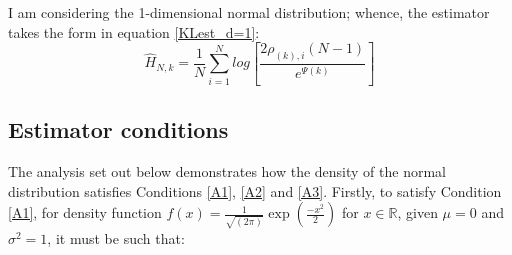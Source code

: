\documentclass[12pt]{report}
\begin{document}
I am considering the 1-dimensional normal distribution; whence, the estimator takes the form in equation \ref{KLest_d=1}:
\begin{equation}
\hat{H}_{N, k} =  \frac{1}{N} \sum_{i=1}^{N} log \left[ \frac{2\rho_{(k),i}(N-1)}{e^{\Psi(k)}} \right]\nonumber
\end{equation}

\subsection{Estimator conditions} \label{N_conditions}

The analysis set out below demonstrates how the density of the normal distribution satisfies Conditions \ref{A1}, \ref{A2} and \ref{A3}. Firstly, to satisfy Condition \ref{A1}, for density function $f(x) = \frac{1}{\sqrt{(2\pi)}} \exp{ \left( \frac{-x^2}{2} \right)}$ for $x \in \mathbb{R}$, given $\mu = 0$ and $\sigma^2 = 1$, it must be such that:
\end{document}
